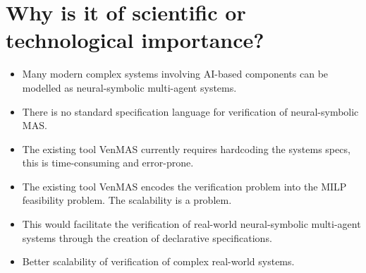 \documentclass[11pt]{article}
\begin{document}
  


\section{Why is it of scientific or technological importance?}


\begin{itemize}
\item Many modern complex systems involving AI-based components can be
  modelled as neural-symbolic multi-agent systems.
  
\item There is no standard specification language for verification of
  neural-symbolic MAS.

\item The existing tool VenMAS currently requires hardcoding the
  systems specs, this is time-consuming and error-prone.

\item The existing tool VenMAS encodes the verification problem into
  the MILP feasibility problem. The scalability is a problem.

\item This would facilitate the verification of real-world
  neural-symbolic multi-agent systems through the creation of
  declarative specifications.

\item Better scalability of verification of complex real-world systems.
\end{itemize}
\end{document}
